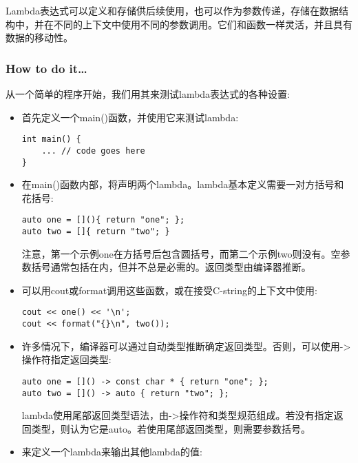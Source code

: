 
Lambda表达式可以定义和存储供后续使用，也可以作为参数传递，存储在数据结构中，并在不同的上下文中使用不同的参数调用。它们和函数一样灵活，并且具有数据的移动性。

\subsubsection{How to do it…}

从一个简单的程序开始，我们用其来测试lambda表达式的各种设置:

\begin{itemize}
\item 
首先定义一个main()函数，并使用它来测试lambda:

\begin{lstlisting}[style=styleCXX]
int main() {
	... // code goes here
}
\end{lstlisting}

\item 
在main()函数内部，将声明两个lambda。lambda基本定义需要一对方括号和花括号:

\begin{lstlisting}[style=styleCXX]
auto one = [](){ return "one"; };
auto two = []{ return "two"; }
\end{lstlisting}

注意，第一个示例one在方括号后包含圆括号，而第二个示例two则没有。空参数括号通常包括在内，但并不总是必需的。返回类型由编译器推断。

\item 
可以用cout或format调用这些函数，或在接受C-string的上下文中使用:

\begin{lstlisting}[style=styleCXX]
cout << one() << '\n';
cout << format("{}\n", two());
\end{lstlisting}

\item 
许多情况下，编译器可以通过自动类型推断确定返回类型。否则，可以使用->操作符指定返回类型:

\begin{lstlisting}[style=styleCXX]
auto one = []() -> const char * { return "one"; };
auto two = []() -> auto { return "two"; };
\end{lstlisting}

lambda使用尾部返回类型语法，由->操作符和类型规范组成。若没有指定返回类型，则认为它是auto。若使用尾部返回类型，则需要参数括号。

\item 
来定义一个lambda来输出其他lambda的值:


\end{itemize}
